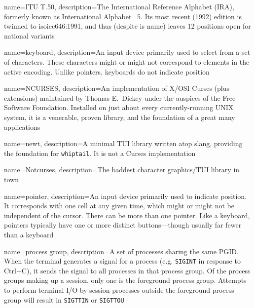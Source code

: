 {
  name={ITU T.50},
  description={The International Reference Alphabet (IRA), formerly known as
   International Alphabet \textnumero\ 5. Its most recent (1992)
   edition is twinned to \Gls{isoiec646}:1991, and thus (despite is name)
   leaves 12 positions open for national variants}
}

{
  name={keyboard},
  description={An input device primarily used to select from a set of
  characters. These characters might or might not correspond to elements in
  the active encoding. Unlike pointers, keyboards do not indicate position}
}

{
  name={NCURSES},
description={An implementation of X/OSI Curses (plus extensions) maintained by
  Thomas E.\ Dickey under the auspices of the Free Software Foundation.
  Installed on just about every currently-running UNIX system, it is a
  venerable, proven library, and the foundation of a great many applications}
}

{
  name={newt},
description={A minimal TUI library written atop slang, providing the foundation
  for \texttt{whiptail}. It is not a Curses implementation}
}

{
  name={Notcurses},
description={The baddest character graphics/TUI library in town}
}

{
  name={pointer},
description={An input device primarily used to indicate position. It
  corresponds with one cell at any given time, which might or might not be
  independent of the cursor. There can be more than one pointer. Like a
  \gls{keyboard}, pointers typically have one or more distinct buttons---though
  usually far fewer than a keyboard}
}

{
  name={process group},
description={A set of processes sharing the same PGID. When the terminal
  generates a signal for a process (e.g. \texttt{SIGINT} in response to Ctrl+C), it
  sends the signal to all processes in that process group. Of the process
  groups making up a session, only one is the foreground process group.
  Attempts to perform terminal I/O by session processes outside the foreground
  process group will result in \texttt{SIGTTIN} or \texttt{SIGTTOU}}
}

